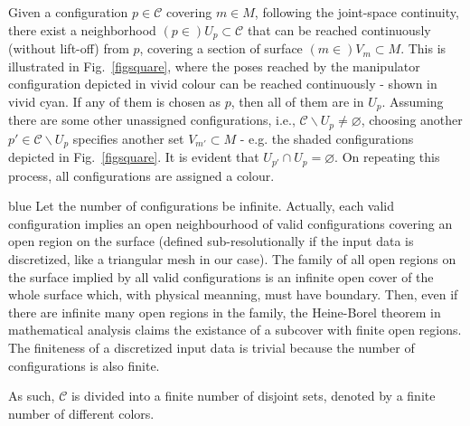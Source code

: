 \documentclass[journal]{IEEEtran}
\begin{document}
Given a configuration $p \in \mathscr{C}$ covering $m\in M$, following the joint-space continuity, there exist a neighborhood $(p\in)U_p\subset \mathscr{C}$ that can be reached continuously (without lift-off) from $p$, covering a section of surface 
$(m\in )V_{m}\subset M$. This is illustrated in Fig.~\ref{figsquare}, where the poses reached by the manipulator 
configuration depicted in vivid colour can be reached continuously - shown in vivid cyan. 
If any of them is chosen as $p$, then all of them are in $U_p$. 
Assuming there are some other unassigned configurations, i.e., $\mathscr{C}\backslash U_p\neq \varnothing$, 
choosing another  $p'\in \mathscr{C}\backslash U_p$ specifies another set $V_{m'}\subset M$ - e.g. the shaded 
configurations depicted in Fig.~\ref{figsquare}. 
It is evident that $U_{p'} \cap U_{p} = \varnothing$. %
On repeating this process, all configurations are assigned a colour. 
\begin{color}{blue}
Let the number of configurations be infinite. Actually, each valid configuration implies an open neighbourhood of valid configurations covering an open region on the surface (defined sub-resolutionally if the input data is discretized, like a triangular mesh in our case). The family of all open regions on the surface implied by all valid configurations is an infinite open cover of the whole surface which, with physical meanning, must have boundary. Then, even if there are infinite many open regions in the family, the Heine-Borel theorem in mathematical analysis claims the existance of a subcover with finite open regions. The finiteness of a discretized input data is trivial because the number of configurations is also finite.
\end{color}
As such, $\mathscr{C}$ is divided into a finite number of disjoint sets, denoted by a finite number of different colors. 
\end{document}
